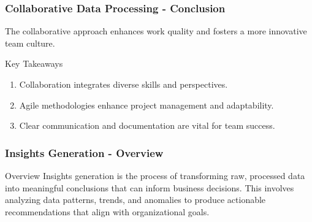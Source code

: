\documentclass[aspectratio=169]{beamer}
\begin{document}
\begin{frame}[fragile]
    \frametitle{Collaborative Data Processing - Conclusion}
    The collaborative approach enhances work quality and fosters a more innovative team culture. 
    \begin{block}{Key Takeaways}
        \begin{enumerate}
            \item Collaboration integrates diverse skills and perspectives.
            \item Agile methodologies enhance project management and adaptability.
            \item Clear communication and documentation are vital for team success.
        \end{enumerate}
    \end{block}
\end{frame}

\begin{frame}[fragile]
    \frametitle{Insights Generation - Overview}
    \begin{block}{Overview}
        Insights generation is the process of transforming raw, processed data into meaningful conclusions that can inform business decisions. 
        This involves analyzing data patterns, trends, and anomalies to produce actionable recommendations that align with organizational goals.
    \end{block}
\end{frame}
\end{document}
